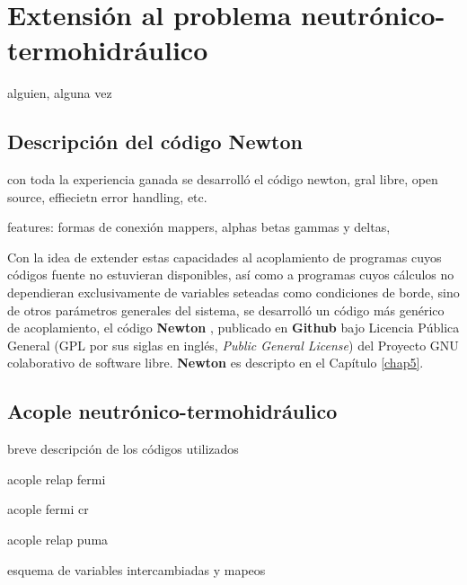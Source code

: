 \chapter{Extensión al problema neutrónico-termohidráulico}
\label{chap4}
\chapterquote
{}
{alguien, alguna vez}

\section{Descripción del código Newton}
\label{4:newton}

con toda la experiencia ganada se desarrolló el código newton, gral
libre, open source, effiecietn error handling, etc.

features:
formas de conexión
mappers, 
alphas betas gammas y deltas,

Con la idea de extender estas capacidades al acoplamiento de programas cuyos códigos fuente no estuvieran disponibles,
así como a programas cuyos cálculos no dependieran exclusivamente de variables seteadas como condiciones de borde,
sino de otros parámetros generales del sistema,
se desarrolló un código más genérico de acoplamiento, el código \textbf{Newton} \cite{newton},
publicado en \textbf{Github} \cite{github} bajo Licencia Pública General (GPL por sus siglas en inglés, \textit{Public General License}) del Proyecto GNU colaborativo de software libre.
\textbf{Newton} es descripto en el Capítulo \ref{chap5}.


\section{Acople neutrónico-termohidráulico}
\label{4:neut-th}
breve descripción de los códigos utilizados

acople relap fermi

acople fermi cr

acople relap puma

esquema de variables intercambiadas y mapeos
